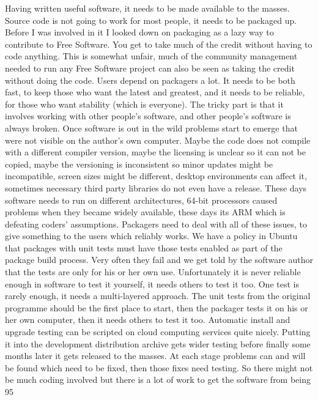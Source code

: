 Having written useful software, it needs to be made available to the masses. Source code is not going to work for most people, it needs to be packaged up. Before I was involved in it I looked down on packaging as a lazy way to contribute to Free Software. You get to take much of the credit without having to code anything. This is somewhat unfair, much of the community management needed to run any Free Software project can also be seen as taking the credit without doing the code.
Users depend on packagers a lot. It needs to be both fast, to keep those who want the latest and greatest, and it needs to be reliable, for those who want stability (which is everyone). The tricky part is that it involves working with other people’s software, and other people’s software is always broken. Once software is out in the wild problems start to emerge that were not visible on the author’s own computer. Maybe the code does not compile with a different compiler version, maybe the licensing is unclear so it can not be copied, maybe the versioning is inconsistent so minor updates might be incompatible, screen sizes might be different, desktop environments can affect it, sometimes necessary third party libraries do not even have a release. These days software needs to run on different architectures, 64-bit processors caused problems when they became widely available, these days its ARM which is defeating coders’ assumptions. Packagers need to deal with all of these issues, to give something to the users which reliably works. 
We have a policy in Ubuntu that packages with unit tests must have those tests enabled as part of the package build process. Very often they fail and we get told by the software author that the tests are only for his or her own use. Unfortunately it is never reliable enough in software to test it yourself, it needs others to test it too. One test is rarely enough, it needs a multi-layered approach. The unit tests from the original programme should be the first place to start, then the packager tests it on his or her own computer, then it needs others to test it too. Automatic install and upgrade testing can be scripted on cloud computing services quite nicely. Putting it into the development distribution archive gets wider testing before finally some months later it gets released to the masses. At each stage problems can and will be found which need to be fixed, then those fixes need testing. So there might not be much coding involved but there is a lot of work to get the software from being 95%
